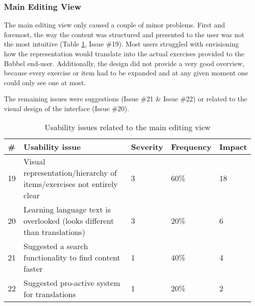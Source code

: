
\subsubsection{Main Editing View}
The main editing view only caused a couple of minor problems. First and foremost, the way the content was structured and presented to the user was not the most intuitive (Table \ref{table:issues-editing-view}, Issue \#19). Most users struggled with envisioning how the representation would translate into the actual exercises provided to the Babbel end-user. Additionally, the design did not provide a very good overview, because every exercise or item had to be expanded and at any given moment one could only see one at most.

The remaining issues were suggestions (Issue \#21 \& Issue \#22) or related to the visual design of the interface (Issue \#20).

\begin{table}[h!]
\centering
\begin{tabular}{|l|p{7cm}|l|l|l|}
\hline
\rowcolor[HTML]{EFEFEF}
\textbf{\#} & \textbf{Usability issue} & \textbf{Severity} & \textbf{Frequency} & \textbf{Impact} \\ \hline
19 & Visual representation/hierarchy of items/exercises not entirely clear & 3 & 60\% & 18 \\ \hline
20 & Learning language text is overlooked (looks different than translations) & 3 & 20\% & 6 \\ \hline
21 & Suggested a search functionality to find content faster & 1 & 40\% & 4 \\ \hline
22 & Suggested pro-active system for translations & 1 & 20\% & 2 \\ \hline
\end{tabular}
\caption{Usability issues related to the main editing view}
\label{table:issues-editing-view}
\end{table}


